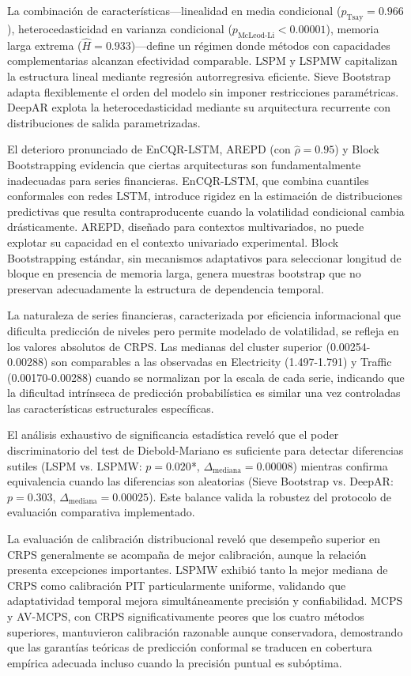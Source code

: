La combinación de características—linealidad en media condicional ($p_{\text{Tsay}} = 0.966$), heterocedasticidad en varianza condicional ($p_{\text{McLeod-Li}} < 0.00001$), memoria larga extrema ($\hat{H} = 0.933$)—define un régimen donde métodos con capacidades complementarias alcanzan efectividad comparable. LSPM y LSPMW capitalizan la estructura lineal mediante regresión autorregresiva eficiente. Sieve Bootstrap adapta flexiblemente el orden del modelo sin imponer restricciones paramétricas. DeepAR explota la heterocedasticidad mediante su arquitectura recurrente con distribuciones de salida parametrizadas.

El deterioro pronunciado de EnCQR-LSTM, AREPD (con $\hat{\rho} = 0.95$) y Block Bootstrapping evidencia que ciertas arquitecturas son fundamentalmente inadecuadas para series financieras. EnCQR-LSTM, que combina cuantiles conformales con redes LSTM, introduce rigidez en la estimación de distribuciones predictivas que resulta contraproducente cuando la volatilidad condicional cambia drásticamente. AREPD, diseñado para contextos multivariados, no puede explotar su capacidad en el contexto univariado experimental. Block Bootstrapping estándar, sin mecanismos adaptativos para seleccionar longitud de bloque en presencia de memoria larga, genera muestras bootstrap que no preservan adecuadamente la estructura de dependencia temporal.

La naturaleza de series financieras, caracterizada por eficiencia informacional que dificulta predicción de niveles pero permite modelado de volatilidad, se refleja en los valores absolutos de CRPS. Las medianas del cluster superior (0.00254-0.00288) son comparables a las observadas en Electricity (1.497-1.791) y Traffic (0.00170-0.00288) cuando se normalizan por la escala de cada serie, indicando que la dificultad intrínseca de predicción probabilística es similar una vez controladas las características estructurales específicas.

El análisis exhaustivo de significancia estadística reveló que el poder discriminatorio del test de Diebold-Mariano es suficiente para detectar diferencias sutiles (LSPM vs. LSPMW: $p = 0.020$*, $\Delta_{\text{mediana}} = 0.00008$) mientras confirma equivalencia cuando las diferencias son aleatorias (Sieve Bootstrap vs. DeepAR: $p = 0.303$, $\Delta_{\text{mediana}} = 0.00025$). Este balance valida la robustez del protocolo de evaluación comparativa implementado.

La evaluación de calibración distribucional reveló que desempeño superior en CRPS generalmente se acompaña de mejor calibración, aunque la relación presenta excepciones importantes. LSPMW exhibió tanto la mejor mediana de CRPS como calibración PIT particularmente uniforme, validando que adaptatividad temporal mejora simultáneamente precisión y confiabilidad. MCPS y AV-MCPS, con CRPS significativamente peores que los cuatro métodos superiores, mantuvieron calibración razonable aunque conservadora, demostrando que las garantías teóricas de predicción conformal se traducen en cobertura empírica adecuada incluso cuando la precisión puntual es subóptima.

